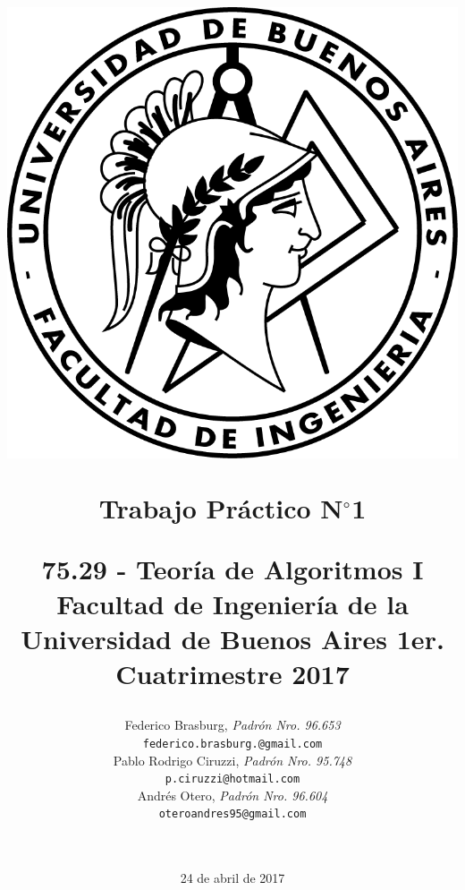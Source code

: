 \documentclass[a4paper,10pt]{article}
\begin{document}
\title{	
	\includegraphics[scale=0.8]{images/logo-fiuba.png} \\
	\begin{center}
		\textbf{Trabajo Práctico N$^{\circ}$1} \linebreak
	\end{center}
	\begin{center}
		\begin{large}
			75.29 - Teoría de Algoritmos I \linebreak
			Facultad de Ingeniería de la Universidad de Buenos Aires \linebreak
			1er. Cuatrimestre 2017 \linebreak
		\end{large}
	\end{center} 
}
\author{	Federico Brasburg, \textit{Padrón Nro. 96.653} \\
			\texttt{ federico.brasburg.@gmail.com } \\ [2.5ex]
			Pablo Rodrigo Ciruzzi, \textit{Padrón Nro. 95.748} \\
			\texttt{ p.ciruzzi@hotmail.com } \\ [2.5ex]
			Andrés Otero, \textit{Padrón Nro. 96.604 } \\
			\texttt{ oteroandres95@gmail.com } \\ [2.5ex] \\
\\
		}
\date{24 de abril de 2017}
\end{document}
